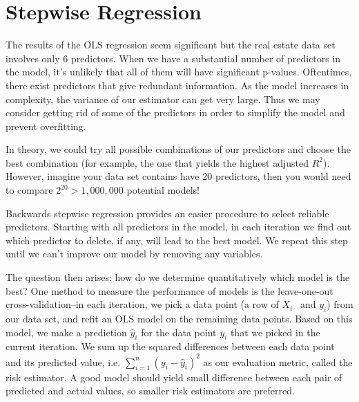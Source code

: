 \documentclass{article}
\begin{document}
\section*{Stepwise Regression}
The results of the OLS regression seem significant but the real estate data set involves only 6 predictors. When we have a substantial number of predictors in the model, it's unlikely that all of them will have significant p-values. Oftentimes, there exist predictors that give redundant information. As the model increases in complexity, the variance of our estimator can get very large. Thus we may consider getting rid of some of the predictors in order to simplify the model and prevent overfitting.

In theory, we could try all possible combinations of our predictors and choose the best combination (for example, the one that yields the highest adjusted $R^2$). However, imagine your data set contains have 20 predictors, then you would need to compare $2^{20} > 1,000,000$ potential models!

Backwards stepwise regression provides an easier procedure to select reliable predictors. Starting with all predictors in the model, in each iteration we find out which predictor to delete, if any, will lead to the best model. We repeat this step until we can't improve our model by removing any variables.

The question then arises: how do we determine quantitatively which model is the best? One method to measure the performance of models is the leave-one-out cross-validation--in each iteration, we pick a data point (a row of $X_{i\cdot}$ and $y_i$) from our data set, and refit an OLS model on the remaining data points. Based on this model, we make a prediction $\hat{y}_{i}$ for the data point $y_i$ that we picked in the current iteration. We sum up the squared differences between each data point and its predicted value, i.e. $\sum_{i=1}^{n} (y_i - \hat{y}_i)^2$ as our evaluation metric, called the risk estimator. A good model should yield small difference between each pair of predicted and actual values, so smaller risk estimators are preferred.
\end{document}
